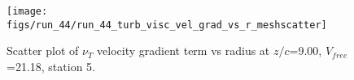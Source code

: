 \begin{figure}[H]
\centering
\texttt{[image: figs/run\_44/run\_44\_turb\_visc\_vel\_grad\_vs\_r\_meshscatter]}
\caption{Scatter plot of $\nu_T$ velocity gradient term vs radius at $z/c$=9.00, $V_{free}$=21.18, station 5.}
\label{fig:run_44_turb_visc_vel_grad_vs_r_meshscatter}
\end{figure}


